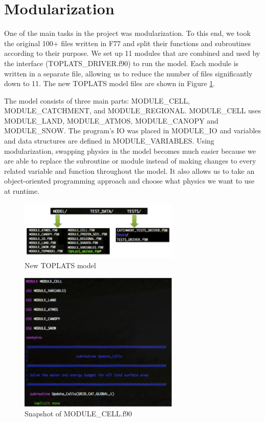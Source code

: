 \documentclass[pdftex,12pt,a4paper]{article}
\begin{document}
\section{Modularization}
One of the main tasks in the project was modularization. To this end, we took the original 100+ files written in F77 and split their functions and subroutines according to their purpose.  We set up 11 modules that are combined and used by the interface (TOPLATS\_DRIVER.f90) to run the model. Each module is written in a separate file, allowing us to reduce the number of files significantly down to 11.  The new TOPLATS model files are shown in Figure \ref{Modules1}. 

\vspace{1em}

The model consists of three main parts: MODULE\_CELL,  MODULE\_CATCHMENT, and MODULE\_REGIONAL. MODULE\_CELL uses MODULE\_LAND, MODULE\_ATMOS, MODULE\_CANOPY and MODULE\_SNOW. The program's IO was placed in MODULE\_IO and variables and data structures are defined in MODULE\_VARIABLES. Using modularization, swapping physics in the model becomes much easier because we are able to replace the subroutine or module instead of making changes to every related variable and function throughout the model. It also allows us to take an object-oriented programming approach and choose what physics we want to use at runtime.

\begin{figure}[h]
	\centering
	\includegraphics[width=3.0in]{Figures/Modules1.png}
	\caption{New TOPLATS model}
	\label{Modules1}
\end{figure}

\begin{figure}[h]
	\centering
	\includegraphics[width=3.0in]{Figures/Modules2.png}
	\caption{Snapshot of MODULE\_CELL.f90}
	\label{Modules2}
\end{figure}
\end{document}
